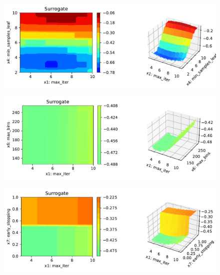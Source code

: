 \documentclass[
  letterpaper,
  DIV=11,
  numbers=noendperiod]{scrreprt}
\begin{document}
\begin{figure}[H]

{\centering \includegraphics{17_spot_hpt_sklearn_multiclass_classification_xgb_files/figure-pdf/cell-46-output-6.pdf}

}

\end{figure}

\begin{figure}[H]

{\centering \includegraphics{17_spot_hpt_sklearn_multiclass_classification_xgb_files/figure-pdf/cell-46-output-7.pdf}

}

\end{figure}

\begin{figure}[H]

{\centering \includegraphics{17_spot_hpt_sklearn_multiclass_classification_xgb_files/figure-pdf/cell-46-output-8.pdf}

}

\end{figure}
\end{document}
